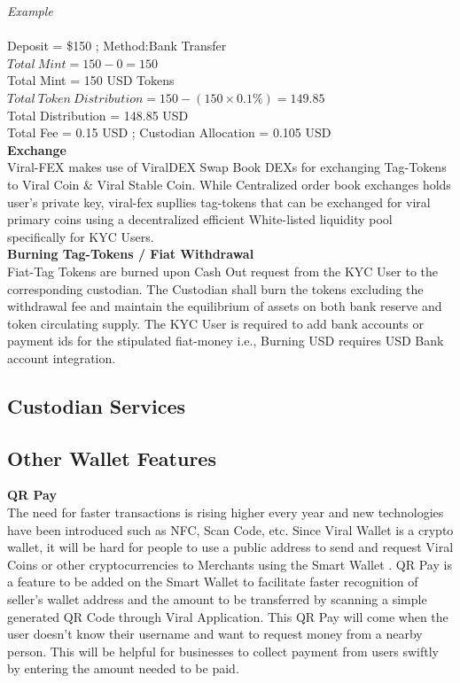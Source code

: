 \documentclass[10pt]{article}
\begin{document}
\textit{Example}\\\\
Deposit = \$150 ; Method:Bank Transfer\\
$Total\:Mint=150-0 = 150$\\
Total Mint = 150 USD Tokens\\
$Total\:Token\:Distribution=150-(150 \times 0.1\%)=149.85$\\
Total Distribution = 148.85 USD\\
Total Fee = 0.15 USD ; Custodian Allocation = 0.105 USD\\

\textbf{Exchange}\\

Viral-FEX makes use of ViralDEX Swap Book DEXs for exchanging Tag-Tokens to Viral Coin \& Viral Stable Coin. While Centralized order book exchanges holds user's private key, viral-fex supllies tag-tokens that can be exchanged for viral primary coins using a decentralized efficient White-listed liquidity pool specifically for KYC Users.\\




\textbf{Burning Tag-Tokens / Fiat Withdrawal}\\

Fiat-Tag Tokens are burned upon Cash Out request from the KYC User to the corresponding custodian. The Custodian shall burn the tokens excluding the withdrawal fee and maintain the equilibrium of assets on both bank reserve and token circulating supply. The KYC User is required to add bank accounts or payment ids for the stipulated fiat-money i.e., Burning USD requires USD Bank account integration. 


\subsection{Custodian Services}

\subsection{Other Wallet Features}

\textbf{QR Pay}\\

The need for faster transactions is rising higher every year and new technologies have been introduced such as NFC, Scan Code, etc. Since Viral Wallet is a crypto wallet, it will be hard for people to use a public address to send and request Viral Coins or other cryptocurrencies to Merchants using the Smart Wallet . QR Pay is a feature to be added on the Smart Wallet to facilitate faster recognition of seller’s wallet address and the amount to be transferred by scanning a simple generated QR Code through Viral Application. This QR Pay will come when the user doesn’t know their username and want to request money from a nearby person. This will be helpful for businesses to collect payment from users swiftly by entering the amount needed to be paid.\\
\end{document}
